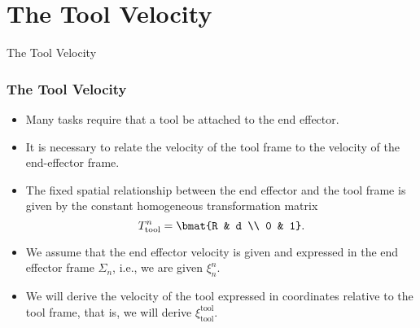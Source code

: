 \section{The Tool Velocity}

\begin{frame}
    The Tool Velocity


\end{frame}

\begingroup
\small

\begin{frame}
    \frametitle{The Tool Velocity}

    \begin{itemize}
        \item Many tasks require that a tool be attached to the end effector.
        \item It is necessary to relate the velocity of the tool frame to the 
        velocity of the end-effector frame.
        \item The fixed spatial relationship between the end effector and the 
        tool frame is given by the constant homogeneous transformation matrix 
        \[
        T_{\textrm{tool}}^n = \bmat{R & d \\ 0 & 1}.
        \]
        \item We assume that the end effector velocity is given and expressed in
        the end effector frame $\Sigma_n$, i.e., we are given $\xi_n^n$.
        \item We will derive the velocity of the tool expressed in coordinates
        relative to the tool frame, that is, we will derive
        $\xi_{\textrm{tool}}^{\textrm{tool}}$.
    \end{itemize}
\end{frame}




